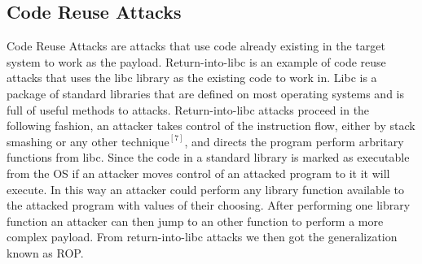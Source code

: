 \documentclass[11pt]{amsart}
\begin{document}
\subsection*{Code Reuse Attacks}
Code Reuse Attacks are attacks that use code already existing in the target system to work as the payload. Return-into-libc is an example of code reuse attacks that uses the libc library as the existing code to work in. Libc is a package of standard libraries that are defined on most operating systems and is full of useful methods to attacks. Return-into-libc attacks proceed in the following fashion, an attacker takes control of the instruction flow, either by stack smashing or any other $\text{technique}^{[7]}$, and directs the program perform arbritary functions from libc. Since the code in a standard library is marked as executable from the OS if an attacker moves control of an attacked program to it it will execute. In this way an attacker could perform any library function available to the attacked program with values of their choosing. After performing one library function an attacker can then jump to an other function to perform a more complex payload.  From return-into-libc attacks we then got the generalization known as ROP.
\end{document}
